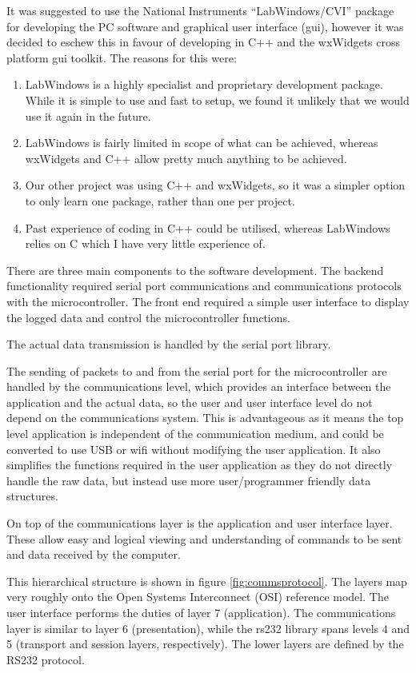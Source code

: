 \documentclass[a4paper,10pt]{article}  %
\begin{document}
It was suggested to use the National Instruments ``LabWindows/CVI''
package for developing the PC software and graphical user interface
(gui), however it was decided to eschew this in favour of developing
in C++ and the wxWidgets cross platform gui toolkit. The reasons for
this were:
\begin{enumerate}
\item LabWindows is a highly specialist and proprietary development
  package. While it is simple to use and fast to setup, we found it
  unlikely that we would use it again in the future.
\item LabWindows is fairly limited in scope of what can be achieved,
  whereas wxWidgets and C++ allow pretty much anything to be achieved.
\item Our other project was using C++ and wxWidgets, so it was a
  simpler option to only learn one package, rather than one per project.
\item Past experience of coding in C++ could be utilised, whereas
  LabWindows relies on C which I have very little experience of.
\end{enumerate}

There are three main components to the software development. The
backend functionality required serial port communications and
communications protocols with the microcontroller. The front end required a simple
user interface to display the logged data and control the
microcontroller functions.

The actual data transmission is handled by the serial port
library.

The sending of packets to and from the serial port for the
microcontroller are handled by the communications level, which
provides an interface between the application and the actual data, so
the user and user interface level do not depend on the communications
system. This is advantageous as it means the top level application is
independent of the communication medium, and could be converted to use
USB or wifi without modifying the user application. It also simplifies
the functions required in the user application as they do not directly
handle the raw data, but instead use more user/programmer friendly
data structures.

On top of the communications layer is the application and user
interface layer. These allow easy and logical viewing and
understanding of commands to be sent and data received by the
computer.

This hierarchical structure is shown in figure
\ref{fig:commsprotocol}. The layers map very roughly onto the Open
Systems Interconnect (OSI) reference model. The user interface
performs the duties of layer 7 (application). The communications layer
is similar to layer 6 (presentation), while the rs232 library spans
levels 4 and 5 (transport and session layers, respectively). The lower
layers are defined by the RS232 protocol.
\end{document}
